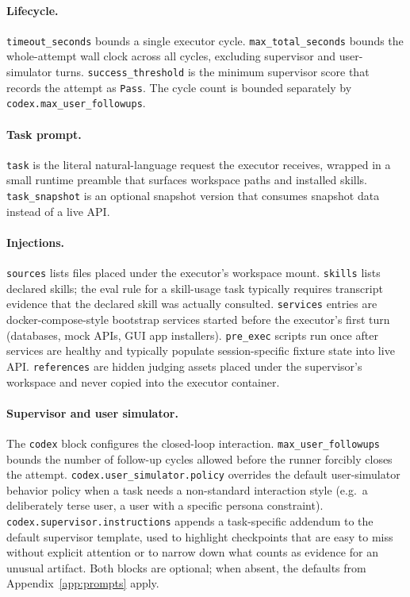 \paragraph{Lifecycle.}
\texttt{timeout\_seconds} bounds a single executor cycle.
\texttt{max\_total\_seconds} bounds the whole-attempt wall clock
across all cycles, excluding supervisor and user-simulator turns.
\texttt{success\_threshold} is the minimum supervisor score that
records the attempt as \texttt{Pass}. The cycle count is bounded separately by
\texttt{codex.max\_user\_followups}.

\paragraph{Task prompt.}
\texttt{task} is the literal natural-language request the executor
receives, wrapped in a small runtime preamble that surfaces workspace
paths and installed skills. \texttt{task\_snapshot} is an optional
snapshot version that consumes snapshot data
instead of a live API.

\paragraph{Injections.}
\texttt{sources} lists files placed under the executor's workspace mount.
\texttt{skills} lists declared skills; the eval rule for a
skill-usage task typically requires transcript evidence that the
declared skill was actually consulted. \texttt{services} entries are
docker-compose-style bootstrap services started before the executor's
first turn (databases, mock APIs, GUI app installers).
\texttt{pre\_exec} scripts run once after services are healthy and
typically populate session-specific fixture state into live API.
\texttt{references} are hidden judging assets placed under the
supervisor's workspace and never copied into the executor container.

\paragraph{Supervisor and user simulator.}
The \texttt{codex} block configures the closed-loop interaction.
\texttt{max\_user\_followups} bounds the number of follow-up cycles
allowed before the runner forcibly closes the attempt.
\texttt{codex.user\_simulator.policy} overrides the default
user-simulator behavior policy when a task needs a non-standard
interaction style (e.g.\ a deliberately terse user, a user with a
specific persona constraint).
\texttt{codex.supervisor.instructions} appends a task-specific
addendum to the default supervisor template, used to highlight
checkpoints that are easy to miss without explicit attention or to
narrow down what counts as evidence for an unusual artifact.
Both blocks are optional; when absent, the defaults from
Appendix~\ref{app:prompts} apply.

